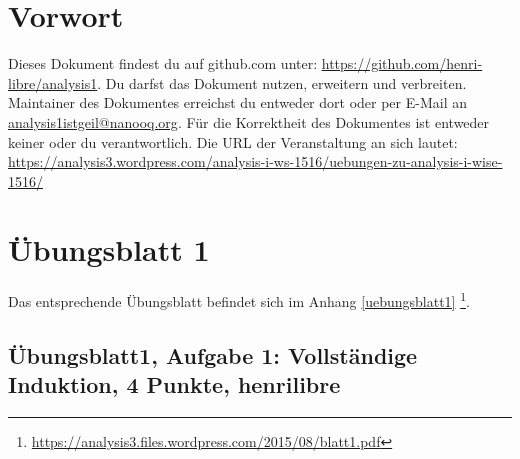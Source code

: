\documentclass[12pt,a4paper]{report}
\begin{document}
\newcommand \GruppeA {henrilibre}

	\tableofcontents
	
	\newpage
	\setcounter{chapter}{-1}
\chapter{Vorwort}
	Dieses Dokument findest du auf github.com unter: \href{https://github.com/henri-libre/analysis1}{https://github.com/henri-libre/analysis1}. Du darfst das Dokument nutzen, erweitern und verbreiten. Maintainer des Dokumentes erreichst du entweder dort oder per E-Mail an \href{analysis1istgeil@nanooq.org}{analysis1istgeil@nanooq.org}. Für die Korrektheit des Dokumentes ist entweder keiner oder du verantwortlich. Die URL der Veranstaltung an sich lautet: \href{https://analysis3.wordpress.com/analysis-i-ws-1516/uebungen-zu-analysis-i-wise-1516/}{https://analysis3.wordpress.com/analysis-i-ws-1516/uebungen-zu-analysis-i-wise-1516/}
	
\chapter{Übungsblatt 1}
	
	Das entsprechende Übungsblatt befindet sich im Anhang \ref{uebungsblatt1} \footnote{\href{https://analysis3.files.wordpress.com/2015/08/blatt1.pdf}{https://analysis3.files.wordpress.com/2015/08/blatt1.pdf}}.

\newpage		
\section{Übungsblatt1, Aufgabe 1: Vollständige Induktion, 4 Punkte, \GruppeA}
	
\end{document}
